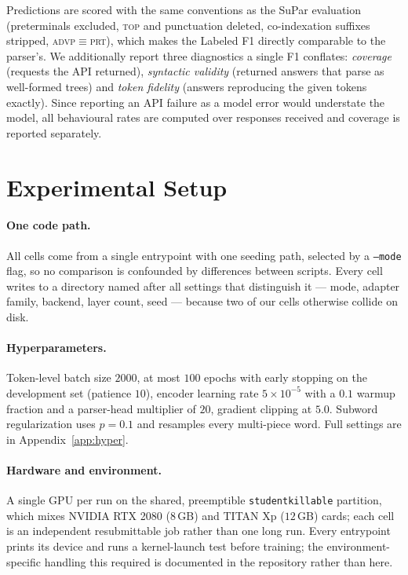 \documentclass[11pt]{article}
\begin{document}
Predictions are scored with the same conventions as the SuPar evaluation
(preterminals excluded, \textsc{top} and punctuation deleted, co-indexation
suffixes stripped, \textsc{advp}$\equiv$\textsc{prt}), which makes the Labeled
F1 directly comparable to the parser's. We additionally report three
diagnostics a single F1 conflates: \emph{coverage} (requests the API returned),
\emph{syntactic validity} (returned answers that parse as well-formed trees) and
\emph{token fidelity} (answers reproducing the given tokens exactly). Since
reporting an API failure as a model error would understate the model, all
behavioural rates are computed over responses received and coverage is reported
separately.

\section{Experimental Setup}

\paragraph{One code path.} All cells come from a single entrypoint with one
seeding path, selected by a \texttt{--mode} flag, so no comparison is confounded by
differences between scripts. Every cell writes to a directory named after all
settings that distinguish it --- mode, adapter family, backend, layer count, seed
--- because two of our cells otherwise collide on disk.

\paragraph{Hyperparameters.} Token-level batch size $2000$, at most $100$ epochs
with early stopping on the development set (patience $10$), encoder learning rate
$5\times10^{-5}$ with a $0.1$ warmup fraction and a parser-head multiplier of
$20$, gradient clipping at $5.0$. Subword regularization uses $p{=}0.1$ and
resamples every multi-piece word. Full settings are in
Appendix~\ref{app:hyper}.

\paragraph{Hardware and environment.} A single GPU per run on the shared,
preemptible \texttt{studentkillable} partition, which mixes NVIDIA RTX 2080
($8$\,GB) and TITAN Xp ($12$\,GB) cards; each cell is an independent
resubmittable job rather than one long run. Every entrypoint prints its device
and runs a kernel-launch test before training; the environment-specific
handling this required is documented in the repository rather than here.
\end{document}
